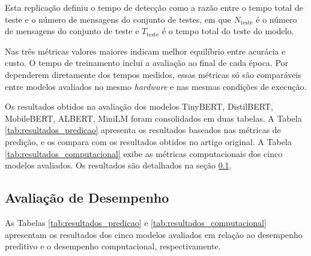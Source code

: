 \documentclass[12pt]{article}
\begin{document}
        Esta replicação definiu o tempo de detecção como a razão entre o tempo total de teste e o número de mensagens do conjunto de testes, em que $N_{\text{teste}}$ é o número de mensagens do conjunto de teste e $T_{\text{teste}}$ é o tempo total do teste do modelo.

        Nas três métricas valores maiores indicam melhor equilíbrio entre acurácia e custo. O tempo de treinamento inclui a avaliação ao final de cada época. Por dependerem diretamente dos tempos medidos, essas métricas só são comparáveis entre modelos avaliados no mesmo \textit{hardware} e nas mesmas condições de execução. 

        Os resultados obtidos na avaliação dos modelos TinyBERT, DistilBERT, MobileBERT, ALBERT, MiniLM foram consolidados em duas tabelas. A Tabela \ref{tab:resultados_predicao} apresenta os resultados baseados nas métricas de predição, e os compara com os resultados obtidos no artigo original. A Tabela \ref{tab:resultados_computacional} exibe as métricas computacionais dos cinco modelos avaliados.  Os resultados são detalhados na seção \ref{sub:perf_assm}.
        
 \subsection{Avaliação de Desempenho} \label{sub:perf_assm}

        As Tabelas \ref{tab:resultados_predicao} e \ref{tab:resultados_computacional} apresentam os resultados dos cinco modelos avaliados em relação ao desempenho preditivo e o desempenho computacional, respectivamente. 

\end{document}
